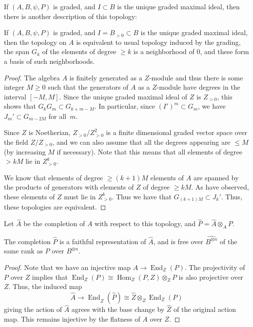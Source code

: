 \documentclass[ALCO,ThmDefs,Unicode,epreuves]{cedram}
\DeclareMathOperator{\End}{End}
\DeclareMathOperator{\Hom}{Hom}
\begin{document}
 If $(A,B,\psi,P)$ is graded, and $I\subset B$ is the unique graded
 maximal ideal, then there is another description of this topology:
 \begin{lemma}\label{lem:grading-equivalent}
 If $(A,B,\psi,P)$ is graded, and $I=B_{>0}\subset B$ is the unique graded
 maximal ideal, then the topology on $A$ is equivalent to usual
 topology induced by the grading, \ie the span $G_k$ of the elements of
 degree $\geq k$ is a neighborhood of 0, and these form a basis of
 such neighborhoods.
\end{lemma}
\begin{proof}
The algebra $A$ is finitely generated as a
$Z$-module and thus there is some integer
$M\geq 0$ such that the generators of $ A$ as a $Z$-module have
degrees in the interval $[-M,M]$. Since the unique graded maximal
ideal of $Z$ is $Z_{>0}$, 
this shows that $G_kG_{m}\subset G_{k+m-M}$. In particular, since $(I')^m\subset G_m$, we have $J_m'\subset G_{m-2M}$
for all~$m$.

Since $Z$ is Noetherian,
$Z_{>0}/Z_{>0}^2$ is a finite dimensional graded vector space over the field $Z/Z_{>0}$, and
we can also assume that all the degrees appearing are $\leq M$ (by
increasing $M$ if necessary). Note
that this means that all elements of degree $>kM$ lie in $Z_{>0}^k$. 

We know that elements of degree $\geq (k+1)M$
elements of $A$ are spanned by the products of generators with
elements of $Z$ of degree $\geq kM$. As have observed, these elements
of $Z$ must lie in $Z_{>0}^k$. Thus we have that $G_{(k+1)M}\subset J_k'$.
Thus, these
topologies are equivalent. 
\end{proof}
 \begin{defi}
 Let $\widehat{A}$ be the completion of $A$ with respect to this
 topology, and $\widehat{P}=\widehat{A}\otimes_AP$. 
 \end{defi}

 \begin{lemma}\label{lem:faithful-completion}
 The completion $\widehat{P}$ is a faithful representation of
 $\widehat{A}$, and is free over $\widehat{B^{\otimes n}}$ of the
 same rank as $P$ over $B^{\otimes n}$. 
 \end{lemma}
 \begin{proof}
Note that we have an injective map
$A\to \End_{Z}(P)$. The projectivity of $P$
over $Z$ implies that $ \End_{Z}(P)\cong \Hom_Z(P,Z)\otimes_Z P$ is also
projective over $Z$.
Thus, the induced map
\[\widehat{A}\to \End_{\widehat{Z}}(\widehat{P})\cong
 \widehat{{Z}}\otimes_{Z}\End_{{Z}}(P)
\]
giving the action of $\widehat{A}$ agrees with the base change by
$\widehat{Z}$ of the original action map. This remains injective by
the flatness of $A$ over $Z$. 
 \end{proof}
\end{document}
